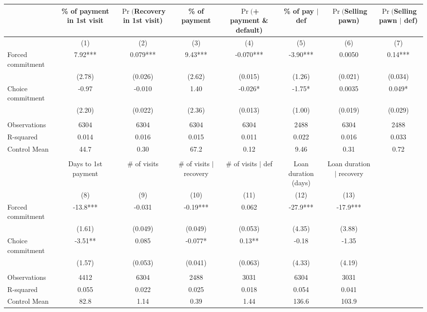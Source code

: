\begin{tabular}{lccccccc}
\toprule
      & \% of payment in 1st visit & $\Pr($Recovery in 1st visit) & \% of payment & $\Pr($+ payment \& default) & \% of pay $|$ def  & $\Pr($Selling pawn) & $\Pr($Selling pawn $|$ def) \\
\midrule
\midrule
      & (1)   & (2)   & (3)   & (4)   & (5)   & (6)   & (7) \\
\midrule
\midrule
Forced commitment & 7.92*** & 0.079*** & 9.43*** & -0.070*** & -3.90*** & 0.0050 & 0.14*** \\
      & (2.78) & (0.026) & (2.62) & (0.015) & (1.26) & (0.021) & (0.034) \\
Choice commitment & -0.97 & -0.010 & 1.40  & -0.026* & -1.75* & 0.0035 & 0.049* \\
      & (2.20) & (0.022) & (2.36) & (0.013) & (1.00) & (0.019) & (0.029) \\
      &       &       &       &       &       &       &  \\
\midrule
Observations & 6304  & 6304  & 6304  & 6304  & 2488  & 6304  & 2488 \\
R-squared & 0.014 & 0.016 & 0.015 & 0.011 & 0.022 & 0.016 & 0.033 \\
Control Mean & 44.7  & 0.30  & 67.2  & 0.12  & 9.46  & 0.31  & 0.72 \\
\midrule
\midrule
      &       &       &       &       &       &       &  \\
\midrule
      & Days to 1st payment & \# of visits & \# of visits $|$ recovery & \# of visits $|$ def & Loan duration (days) & Loan duration $|$ recovery &  \\
\midrule
\midrule
      & (8)   & (9)   & (10)  & (11)  & (12)  & (13)  &  \\
\midrule
\midrule
Forced commitment & -13.8*** & -0.031 & -0.19*** & 0.062 & -27.9*** & -17.9*** &  \\
      & (1.61) & (0.049) & (0.049) & (0.053) & (4.35) & (3.88) &  \\
Choice commitment & -3.51** & 0.085 & -0.077* & 0.13** & -0.18 & -1.35 &  \\
      & (1.57) & (0.053) & (0.041) & (0.063) & (4.33) & (4.19) &  \\
      &       &       &       &       &       &       &  \\
\midrule
Observations & 4412  & 6304  & 2488  & 3031  & 6304  & 3031  &  \\
R-squared & 0.055 & 0.022 & 0.025 & 0.018 & 0.054 & 0.041 &  \\
Control Mean & 82.8  & 1.14  & 0.39  & 1.44  & 136.6 & 103.9 &  \\
\bottomrule
\bottomrule
\end{tabular}%
